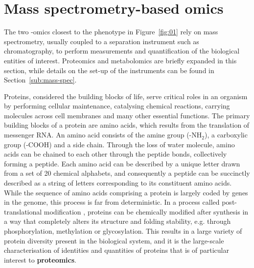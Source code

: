 \section{Mass spectrometry-based omics\label{sub:omics}}

The two -omics closest to the phenotype in Figure~\ref{fig:01} rely on mass spectrometry, usually coupled to a separation instrument such as chromatography, to perform measurements and quantification of the biological entities of interest. Proteomics and metabolomics are briefly expanded in this section, while details on the set-up of the instruments can be found in Section~\ref{sub:mass-spec}.

Proteins, considered the building blocks of life, serve critical roles in an organism by performing cellular maintenance, catalysing chemical reactions, carrying molecules across cell membranes and many other essential functions. The primary building blocks of a protein are amino acids, which results from the translation of messenger RNA. An amino acid consists of the amine group (-NH$_2$), a carboxylic group (-COOH) and a side chain. Through the loss of water molecule, amino acids can be chained to each other through the peptide bonds, collectively forming a peptide. Each amino acid can be described by a unique letter drawn from a set of 20 chemical alphabets, and consequently a peptide can be succinctly described as a string of letters corresponding to its constituent amino acids. While the sequence of amino acids comprising a protein is largely coded by genes in the genome, this process is far from deterministic. In a process called post-translational modification \cite{mann2003proteomic}, proteins can be chemically modified after synthesis in a way that completely alters its structure and folding stability, e.g. through phosphorylation, methylation or glycosylation. This results in a large variety of protein diversity present in the biological system, and it is the large-scale characterisation of identities and quantities of proteins that is of particular interest to \textbf{proteomics}. 

